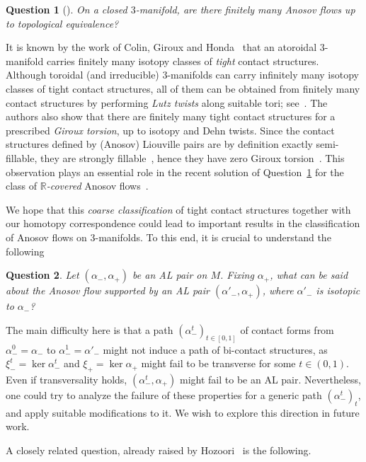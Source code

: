 \documentclass[letterpaper, 11pt]{article}
\numberwithin{equation}{section}
\newtheorem{question}{Question}
\newcommand{\R}{\mathbb{R}}
\begin{document}
\begin{question}[\cite{B17}] \label{quest:finite} On a closed $3$-manifold, are there finitely many Anosov flows up to topological equivalence?
\end{question}

It is known by the work of Colin, Giroux and Honda~\cite{CGH} that an atoroidal $3$-manifold carries finitely many isotopy classes of \emph{tight} contact structures. Although toroidal (and irreducible) $3$-manifolds can carry infinitely many isotopy classes of tight contact structures, all of them can be obtained from finitely many contact structures by performing \emph{Lutz twists} along suitable tori; see~\cite{CGH}. The authors also show that there are finitely many tight contact structures for a prescribed \emph{Giroux torsion}, up to isotopy and Dehn twists. Since the contact structures defined by (Anosov) Liouville pairs are by definition exactly semi-fillable, they are strongly fillable~\cite[Corollary 1.4]{E04}, hence they have zero Giroux torsion~\cite[Corollary 3]{G06}. This observation plays an essential role in the recent solution of Question~\ref{quest:finite} for the class of \emph{$\R$-covered} Anosov flows~\cite{BM21, M23}.

We hope that this \emph{coarse classification} of tight contact structures together with our homotopy correspondence could lead to important results in the classification of Anosov flows on $3$-manifolds. To this end, it is crucial to understand the following

\begin{question} Let $(\alpha_-, \alpha_+)$ be an AL pair on $M$. Fixing $\alpha_+$, what can be said about the Anosov flow supported by an AL pair $(\alpha'_-, \alpha_+)$, where $\alpha'_-$ is isotopic to $\alpha_-$?
\end{question}

The main difficulty here is that a path $(\alpha^t_-)_{t\in [0,1]}$ of contact forms from $\alpha^0_- = \alpha_-$ to $\alpha^1_- = \alpha'_-$ might not induce a path of bi-contact structures, as $\xi^t_- = \ker \alpha^t_-$ and $\xi_+ = \ker \alpha_+$ might fail to be transverse for some $t \in (0,1)$. Even if transversality holds, $(\alpha^t_-, \alpha_+)$ might fail to be an AL pair. Nevertheless, one could try to analyze the failure of these properties for a generic path $(\alpha^t_-)_t$, and apply suitable modifications to it. We wish to explore this direction in future work.

A closely related question, already raised by Hozoori~\cite[Question 7.2]{H22a} is the following.
\end{document}
